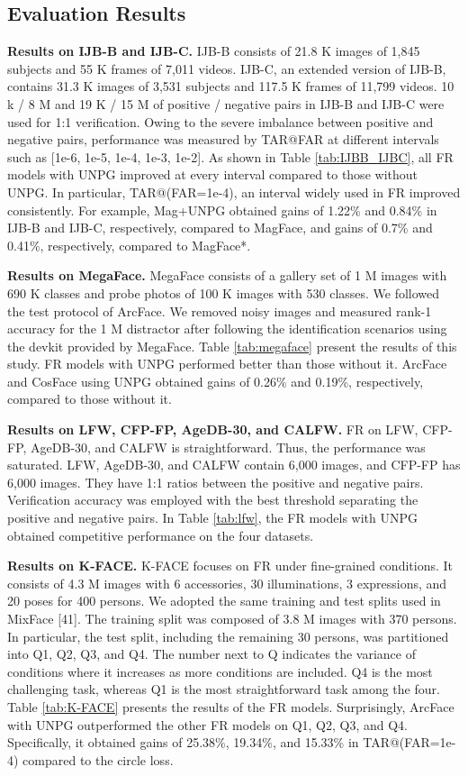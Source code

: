 \documentclass[10pt,twocolumn]{article}
\begin{document}
\subsection{Evaluation Results}
\noindent\textbf{Results on IJB-B and IJB-C.} IJB-B consists of 21.8 K images of 1,845 subjects and 55 K frames of 7,011 videos. IJB-C, an extended version of IJB-B, contains 31.3 K images of 3,531 subjects and 117.5 K frames of 11,799 videos. 10 k / 8 M and 19 K / 15 M of positive / negative pairs in IJB-B and IJB-C were used for 1:1 verification. Owing to the severe imbalance between positive and negative pairs, performance was measured by TAR@FAR at different intervals such as [1e-6, 1e-5, 1e-4, 1e-3, 1e-2]. As shown in Table \ref{tab:IJBB_IJBC}, all FR models with UNPG improved at every interval compared to those without UNPG. In particular, TAR@(FAR=1e-4), an interval widely used in FR improved consistently. For example, Mag+UNPG obtained gains of 1.22\% and 0.84\% in IJB-B and IJB-C, respectively, compared to MagFace, and gains of 0.7\% and 0.41\%, respectively, compared to MagFace*.

\noindent\textbf{Results on MegaFace.} MegaFace consists of a gallery set of 1 M images with 690 K classes and probe photos of 100 K images with 530 classes. We followed the test protocol of ArcFace\cite{deng2019arcface}. We removed noisy images and measured rank-1 accuracy for the 1 M distractor after following the identification scenarios using the devkit provided by MegaFace. Table \ref{tab:megaface} present the results of this study. FR models with UNPG performed better than those without it. ArcFace and CosFace using UNPG obtained gains of 0.26\% and 0.19\%, respectively, compared to those without it.

\noindent\textbf{Results on LFW, CFP-FP, AgeDB-30, and CALFW.} FR on LFW, CFP-FP, AgeDB-30, and CALFW is straightforward. Thus, the performance was saturated. LFW, AgeDB-30, and CALFW contain 6,000 images, and CFP-FP has 6,000 images. They have 1:1 ratios between the positive and negative pairs. Verification accuracy was employed with the best threshold separating the positive and negative pairs. In Table \ref{tab:lfw}, the FR models with UNPG obtained competitive performance on the four datasets. 

\noindent\textbf{Results on K-FACE.} K-FACE focuses on FR under fine-grained conditions. It consists of 4.3 M images with 6 accessories, 30 illuminations, 3 expressions, and 20 poses for 400 persons. We adopted the same training and test splits used in MixFace [41]. The training split was composed of 3.8 M images with 370 persons. In particular, the test split, including the remaining 30 persons, was partitioned into Q1, Q2, Q3, and Q4. The number next to Q indicates the variance of conditions where it increases as more conditions are included. Q4 is the most challenging task, whereas Q1 is the most straightforward task among the four. Table \ref{tab:K-FACE} presents the results of the FR models. Surprisingly, ArcFace with UNPG outperformed the other FR models on Q1, Q2, Q3, and Q4. Specifically, it obtained gains of 25.38\%, 19.34\%, and 15.33\% in TAR@(FAR=1e-4) compared to the circle loss.
\end{document}
